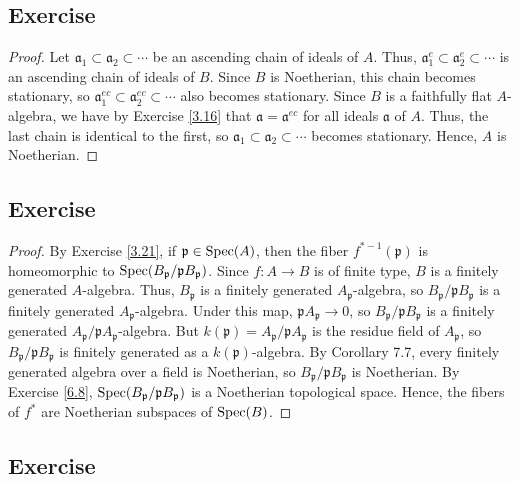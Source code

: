 \subsection{Exercise}\label{7.12}

\begin{proof}
Let $\mathfrak{a}_1 \subset \mathfrak{a}_2 \subset \cdots$ be an ascending chain of ideals of $A$. Thus, 
$\mathfrak{a}_1^e \subset \mathfrak{a}_2^e \subset \cdots$ is an ascending chain of ideals of $B$. Since $B$ is Noetherian,
this chain becomes stationary, so $\mathfrak{a}_1^{ec} \subset \mathfrak{a}_2^{ec} \subset \cdots$ also becomes stationary. Since
$B$ is a faithfully flat $A$-algebra, we have by Exercise \ref{3.16} that $\mathfrak{a} = \mathfrak{a}^{ec}$ for all ideals $\mathfrak{a}$
of $A$. Thus, the last chain is identical to the first, so $\mathfrak{a}_1 \subset \mathfrak{a}_2 \subset \cdots$ becomes stationary. Hence,
$A$ is Noetherian.
\end{proof}

\subsection{Exercise}\label{7.13}

\begin{proof}
By Exercise \ref{3.21}, if $\mathfrak{p} \in \operatorname{Spec}(A)$, then the fiber $f^{*-1}(\mathfrak{p})$ is homeomorphic to 
$\operatorname{Spec}(B_{\mathfrak{p}}/\mathfrak{p}B_{\mathfrak{p}})$. Since $f : A \to B$ is of finite type, $B$ is a finitely generated $A$-algebra. 
Thus, $B_{\mathfrak{p}}$ is a finitely generated $A_{\mathfrak{p}}$-algebra, so $B_{\mathfrak{p}}/\mathfrak{p}B_{\mathfrak{p}}$ is a finitely
generated $A_{\mathfrak{p}}$-algebra. Under this map, $\mathfrak{p}A_{\mathfrak{p}} \to 0$, so $B_{\mathfrak{p}}/\mathfrak{p}B_{\mathfrak{p}}$ is 
a finitely generated $A_{\mathfrak{p}}/\mathfrak{p}A_{\mathfrak{p}}$-algebra. But $k(\mathfrak{p}) = A_{\mathfrak{p}}/\mathfrak{p}A_{\mathfrak{p}}$
is the residue field of $A_{\mathfrak{p}}$, so $B_{\mathfrak{p}}/\mathfrak{p}B_{\mathfrak{p}}$ is finitely generated as a $k(\mathfrak{p})$-algebra.
By Corollary 7.7, every finitely generated algebra over a field is Noetherian, so $B_{\mathfrak{p}}/\mathfrak{p}B_{\mathfrak{p}}$ is Noetherian.
By Exercise \ref{6.8}, $\operatorname{Spec}(B_{\mathfrak{p}}/\mathfrak{p}B_{\mathfrak{p}})$ is a Noetherian topological space. Hence, the fibers of $f^*$ are
Noetherian subspaces of $\operatorname{Spec}(B)$.
\end{proof}

\subsection{Exercise}\label{7.14}

